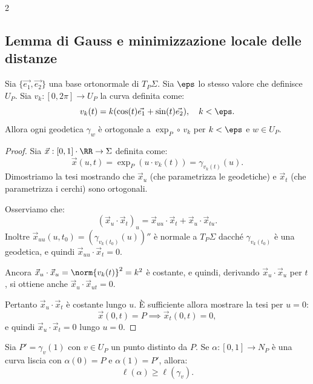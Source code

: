 \begin{multicols*}{2}
    \subsection{Lemma di Gauss e minimizzazione locale delle distanze}

    \begin{lemma} \label{lem:gauss}
        Sia $\{\vec{e_1}, \vec{e_2}\}$ una base ortonormale di $T_P \Sigma$.
        Sia $\eps$ lo stesso valore che definisce $U_P$.
        Sia
        $v_k : [0, 2\pi] \to U_P$ la curva definita come:
        \[
            v_k(t) = k(\cos(t) \vec{e_1} + \sin(t) \vec{e_2}), \quad k < \eps.
        \]
        Allora ogni geodetica
        $\gamma_w$ è ortogonale a $\exp_P \circ \, v_k$ per $k < \eps$ e $w \in U_P$.
    \end{lemma}

    \begin{proof}
        Sia $\vec{x} : [0, 1] \cdot \RR \to \Sigma$ definita come:
        \[ \vec{x}(u, t) = \exp_P(u \cdot v_k(t)) = \gamma_{v_k(t)}(u). \]
        Dimostriamo la tesi mostrando che $\vec{x}_u$ (che parametrizza le geodetiche) e $\vec{x}_t$ (che parametrizza
        i cerchi) sono ortogonali. \smallskip

        Osserviamo che:
        \[ (\vec{x}_u \cdot \vec{x}_t)_u = \vec{x}_{uu} \cdot \vec{x}_t + \vec{x}_u \cdot \vec{x}_{tu}. \]
        Inoltre $\vec{x}_{uu}(u, t_0) = (\gamma_{v_k(t_0)}(u))''$ è normale a $T_P \Sigma$ dacché
        $\gamma_{v_k(t_0)}$ è una geodetica, e quindi $\vec{x}_{uu} \cdot \vec{x}_t = 0$. \smallskip

        Ancora $\vec{x}_u \cdot \vec{x}_u = \norm{v_k(t)}^2 = k^2$ è costante, e quindi, derivando
        $\vec{x}_u \cdot \vec{x}_u$ per $t$, si ottiene anche $\vec{x}_u \cdot \vec{x}_{ut} = 0$. \smallskip

        Pertanto $\vec{x}_u \cdot \vec{x}_t$ è costante lungo $u$. È sufficiente allora mostrare la tesi per
        $u = 0$:
        \[
            \vec{x}(0, t) = P \implies \vec{x}_t(0, t) = 0,
        \]
        e quindi $\vec{x}_u \cdot \vec{x}_t = 0$ lungo $u = 0$.
    \end{proof}

    \begin{corollary}
        Sia $P' = \gamma_v(1)$ con $v \in U_P$ un punto distinto da $P$. Se $\alpha : [0, 1] \to N_P$
        è una curva liscia con $\alpha(0) = P$ e $\alpha(1) = P'$, allora:
        \[
            \boxed{\ell(\alpha) \geq \ell(\gamma_{v}).}
        \]
    \end{corollary}


\end{multicols*}
